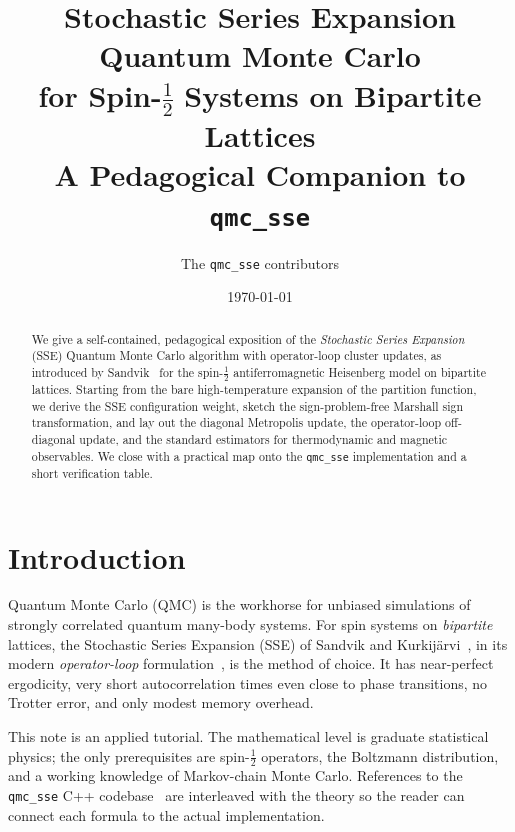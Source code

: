 \documentclass[11pt,a4paper]{article}
\title{\bfseries Stochastic Series Expansion Quantum Monte Carlo \\[2pt]
       \large for Spin-$\tfrac12$ Systems on Bipartite Lattices \\[6pt]
       \normalsize A Pedagogical Companion to \texttt{qmc\_sse}}
\author{The \texttt{qmc\_sse} contributors}
\date{\today}
\theoremstyle{definition}
\theoremstyle{plain}
\begin{document}
\maketitle

\begin{abstract}
We give a self-contained, pedagogical exposition of the
\emph{Stochastic Series Expansion} (SSE) Quantum Monte Carlo
algorithm with operator-loop cluster updates, as introduced by
Sandvik~\cite{sandvik1999} for the spin-$\tfrac12$ antiferromagnetic
Heisenberg model on bipartite lattices. Starting from the bare
high-temperature expansion of the partition function, we derive the
SSE configuration weight, sketch the sign-problem-free Marshall
sign transformation, and lay out the diagonal Metropolis update,
the operator-loop off-diagonal update, and the standard estimators
for thermodynamic and magnetic observables. We close with a
practical map onto the \texttt{qmc\_sse} implementation and a short
verification table.
\end{abstract}

\tableofcontents

\section{Introduction}\label{sec:intro}
Quantum Monte Carlo (QMC) is the workhorse for unbiased simulations
of strongly correlated quantum many-body systems. For spin systems on
\emph{bipartite} lattices, the Stochastic Series Expansion (SSE) of
Sandvik and Kurkij\"arvi~\cite{sandvik1991}, in its modern
\emph{operator-loop} formulation~\cite{sandvik1999}, is the method of
choice. It has near-perfect ergodicity, very short autocorrelation
times even close to phase transitions, no Trotter error, and only
modest memory overhead.

This note is an applied tutorial. The mathematical level is graduate
statistical physics; the only prerequisites are spin-$\tfrac12$
operators, the Boltzmann distribution, and a working knowledge of
Markov-chain Monte Carlo. References to the \texttt{qmc\_sse} C++
codebase~\cite{qmcsse} are interleaved with the theory so the reader
can connect each formula to the actual implementation.

\end{document}
